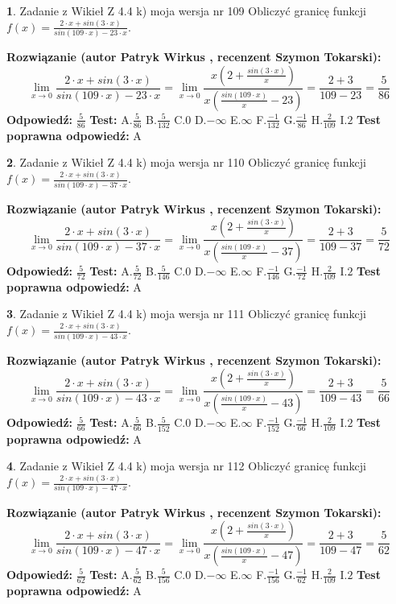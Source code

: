 \documentclass[12pt, a4paper]{article}
\theoremstyle{definition} %
\newtheorem{zad}{}
\newcommand{\zadStart}[1]{\begin{zad}#1\newline}
\newcommand{\zadStop}{\end{zad}}
\newcommand{\rozwStart}[2]{\noindent \textbf{Rozwiązanie (autor #1 , recenzent #2): }\newline}
\newcommand{\rozwStop}{\newline}
\newcommand{\odpStart}{\noindent \textbf{Odpowiedź:}\newline}
\newcommand{\odpStop}{\newline}
\newcommand{\testStart}{\noindent \textbf{Test:}\newline}
\newcommand{\testStop}{\newline}
\newcommand{\kluczStart}{\noindent \textbf{Test poprawna odpowiedź:}\newline}
\newcommand{\kluczStop}{\newline}
\begin{document}
\zadStart{Zadanie z Wikieł Z 4.4 k) moja wersja nr 109}
Obliczyć granicę funkcji $f(x)=\frac{2\cdot x +sin(3\cdot x)}{sin(109\cdot x) -23\cdot x}$.
\zadStop
\rozwStart{Patryk Wirkus}{Szymon Tokarski}
$$\lim\limits_{x\to 0}\frac{2\cdot x +sin(3\cdot x)}{sin(109\cdot x) -23\cdot x}
=\lim\limits_{x\to 0}\frac{x(2+\frac{sin(3\cdot x)}{x})}{x(\frac{sin(109\cdot x)}{x}-23)}
=\frac{2+3}{109-23} = \frac{5}{86}$$
\rozwStop
\odpStart
$\frac{5}{86}$
\odpStop
\testStart
A.$\frac{5}{86}$
B.$\frac{5}{132}$
C.$0$
D.$-\infty$
E.$\infty$
F.$\frac{-1}{132}$
G.$\frac{-1}{86}$
H.$\frac{2}{109}$
I.$2$
\testStop
\kluczStart
A
\kluczStop



\zadStart{Zadanie z Wikieł Z 4.4 k) moja wersja nr 110}
Obliczyć granicę funkcji $f(x)=\frac{2\cdot x +sin(3\cdot x)}{sin(109\cdot x) -37\cdot x}$.
\zadStop
\rozwStart{Patryk Wirkus}{Szymon Tokarski}
$$\lim\limits_{x\to 0}\frac{2\cdot x +sin(3\cdot x)}{sin(109\cdot x) -37\cdot x}
=\lim\limits_{x\to 0}\frac{x(2+\frac{sin(3\cdot x)}{x})}{x(\frac{sin(109\cdot x)}{x}-37)}
=\frac{2+3}{109-37} = \frac{5}{72}$$
\rozwStop
\odpStart
$\frac{5}{72}$
\odpStop
\testStart
A.$\frac{5}{72}$
B.$\frac{5}{146}$
C.$0$
D.$-\infty$
E.$\infty$
F.$\frac{-1}{146}$
G.$\frac{-1}{72}$
H.$\frac{2}{109}$
I.$2$
\testStop
\kluczStart
A
\kluczStop



\zadStart{Zadanie z Wikieł Z 4.4 k) moja wersja nr 111}
Obliczyć granicę funkcji $f(x)=\frac{2\cdot x +sin(3\cdot x)}{sin(109\cdot x) -43\cdot x}$.
\zadStop
\rozwStart{Patryk Wirkus}{Szymon Tokarski}
$$\lim\limits_{x\to 0}\frac{2\cdot x +sin(3\cdot x)}{sin(109\cdot x) -43\cdot x}
=\lim\limits_{x\to 0}\frac{x(2+\frac{sin(3\cdot x)}{x})}{x(\frac{sin(109\cdot x)}{x}-43)}
=\frac{2+3}{109-43} = \frac{5}{66}$$
\rozwStop
\odpStart
$\frac{5}{66}$
\odpStop
\testStart
A.$\frac{5}{66}$
B.$\frac{5}{152}$
C.$0$
D.$-\infty$
E.$\infty$
F.$\frac{-1}{152}$
G.$\frac{-1}{66}$
H.$\frac{2}{109}$
I.$2$
\testStop
\kluczStart
A
\kluczStop



\zadStart{Zadanie z Wikieł Z 4.4 k) moja wersja nr 112}
Obliczyć granicę funkcji $f(x)=\frac{2\cdot x +sin(3\cdot x)}{sin(109\cdot x) -47\cdot x}$.
\zadStop
\rozwStart{Patryk Wirkus}{Szymon Tokarski}
$$\lim\limits_{x\to 0}\frac{2\cdot x +sin(3\cdot x)}{sin(109\cdot x) -47\cdot x}
=\lim\limits_{x\to 0}\frac{x(2+\frac{sin(3\cdot x)}{x})}{x(\frac{sin(109\cdot x)}{x}-47)}
=\frac{2+3}{109-47} = \frac{5}{62}$$
\rozwStop
\odpStart
$\frac{5}{62}$
\odpStop
\testStart
A.$\frac{5}{62}$
B.$\frac{5}{156}$
C.$0$
D.$-\infty$
E.$\infty$
F.$\frac{-1}{156}$
G.$\frac{-1}{62}$
H.$\frac{2}{109}$
I.$2$
\testStop
\kluczStart
A
\kluczStop
\end{document}
